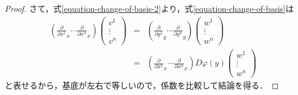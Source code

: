 \documentclass[uplatex, dvipdfmx]{jsreport}
\begin{document}
\begin{proof}
    さて，式\ref{equation-change-of-basis-2}より，式\ref{equation-change-of-basis}は
    \begin{eqnarray*}
        \left( \frac{\partial}{\partial x^1}_x\cdots \frac{\partial}{\partial x^n}_x \right) \left( \begin{array}{c}
            v^1 \\ \vdots \\ v^n
        \end{array} \right) &=& \left( \frac{\partial}{\partial y^1}_y\cdots \frac{\partial}{\partial y^n}_y \right) \left( \begin{array}{c}
            w^1 \\ \vdots \\ w^n
        \end{array} \right) \\
        &=& \left( \frac{\partial}{\partial x^1}_x \cdots \frac{\partial}{\partial x^n}_x \right)D\varphi(y) \left( \begin{array}{c}
            w^1 \\ \vdots \\ w^n
        \end{array} \right)
    \end{eqnarray*}
    と表せるから，基底が左右で等しいので，係数を比較して結論を得る．
\end{proof}
\end{document}

